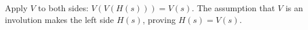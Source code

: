 Apply $V$ to both sides: $V(V(H(s)))=V(s)$. The assumption that $V$ is an involution makes the left side $H(s)$, proving $\boxed{H(s)=V(s)}$.
